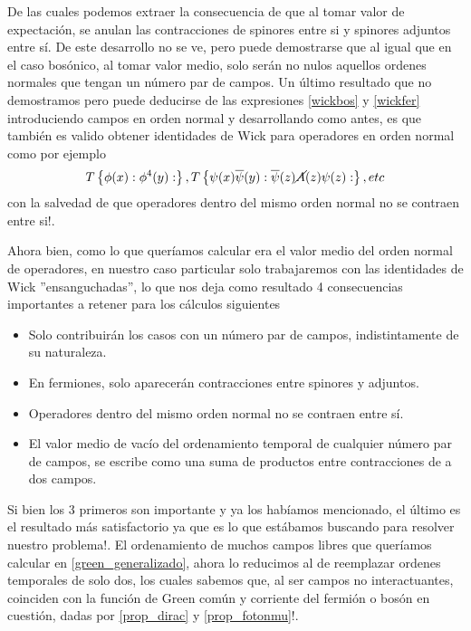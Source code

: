 \documentclass{article}
\numberwithin{equation}{section}
\begin{document}
De las cuales podemos extraer la consecuencia de que al tomar valor
de expectación, se anulan las contracciones de spinores entre si y
spinores adjuntos entre sí. De este desarrollo no se ve, pero puede
demostrarse que al igual que en el caso bosónico, al tomar valor medio,
solo serán no nulos aquellos ordenes normales que tengan un número
par de campos. Un último resultado que no demostramos pero puede deducirse
de las expresiones \ref{wickbos} y \ref{wickfer} introduciendo campos en orden normal y
desarrollando como antes, es que también es valido obtener identidades
de Wick para operadores en orden normal como por ejemplo
\begin{equation}
T\left\{ \phi(x):\phi^{4}(y):\right\} ,T\left\{ \psi(x)\overline{\psi}(y):\overline{\psi}(z)\cancel{A}(z)\psi(z):\right\} ,etc
\end{equation}
con la salvedad de que operadores dentro del mismo orden normal no
se contraen entre si!.

Ahora bien, como lo que queríamos calcular era el valor medio del
orden normal de operadores, en nuestro caso particular solo trabajaremos con las identidades
de Wick ''ensanguchadas'', lo que nos deja como resultado 4 consecuencias
importantes a retener para los cálculos siguientes

\begin{itemize}
	\item Solo contribuirán los casos con un número par de campos, indistintamente
	de su naturaleza.
	\item En fermiones, solo aparecerán contracciones entre spinores y adjuntos.
	\item Operadores dentro del mismo orden normal no se contraen entre sí.
	\item El valor medio de vacío del ordenamiento temporal de cualquier número
	par de campos, se escribe como una suma de productos entre contracciones
	de a dos campos.
\end{itemize}

Si bien los 3 primeros son importante y ya los habíamos mencionado,
el último es el resultado más satisfactorio ya que es lo que estábamos
buscando para resolver nuestro problema!. El ordenamiento de muchos
campos libres que queríamos calcular en \ref{green_generalizado}, ahora lo reducimos al de reemplazar ordenes temporales de solo
dos, los cuales sabemos que, al ser campos no interactuantes, coinciden con la función de Green común
y corriente del fermión o bosón en cuestión, dadas por \ref{prop_dirac} y \ref{prop_fotonmu}!. 
\end{document}
